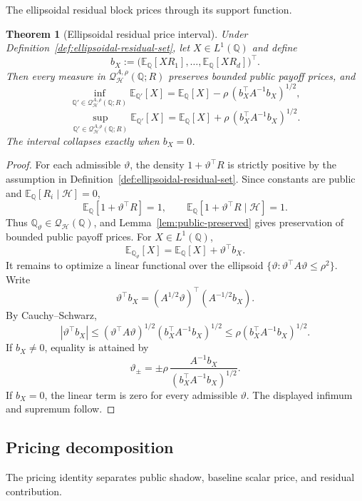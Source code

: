 \documentclass[11pt,a4paper]{amsart}
\theoremstyle{plain}
\newtheorem{theorem}{Theorem}[section]
\theoremstyle{definition}
\theoremstyle{remark}
\newcommand{\QQ}{\mathbb{Q}}
\newcommand{\EE}{\mathbb{E}}
\newcommand{\cH}{\mathcal{H}}
\newcommand{\cQ}{\mathcal{Q}}
\begin{document}
The ellipsoidal residual block prices through its support function.

\begin{theorem}[Ellipsoidal residual price interval]\label{thm:robust-residual-interval}
Under Definition~\ref{def:ellipsoidal-residual-set}, let \(X\in L^1(\QQ)\) and define
\[
        b_X
        :=
        \bigl(\EE_\QQ[XR_1],\ldots,\EE_\QQ[XR_d]\bigr)^\top.
\]
Then every measure in \(\cQ_{\cH}^{A,\rho}(\QQ;R)\) preserves bounded public payoff prices, and
\[
        \inf_{\QQ'\in\cQ_{\cH}^{A,\rho}(\QQ;R)}
        \EE_{\QQ'}[X]
        =
        \EE_\QQ[X]
        -
        \rho\,(b_X^\top A^{-1}b_X)^{1/2},
\]
\[
        \sup_{\QQ'\in\cQ_{\cH}^{A,\rho}(\QQ;R)}
        \EE_{\QQ'}[X]
        =
        \EE_\QQ[X]
        +
        \rho\,(b_X^\top A^{-1}b_X)^{1/2}.
\]
The interval collapses exactly when \(b_X=0\).
\end{theorem}

\begin{proof}
For each admissible \(\vartheta\), the density \(1+\vartheta^\top R\) is strictly positive by the
assumption in Definition~\ref{def:ellipsoidal-residual-set}.  Since constants are public and
\(\EE_\QQ[R_i\mid\cH]=0\),
\[
        \EE_\QQ[1+\vartheta^\top R]=1,
        \qquad
        \EE_\QQ[1+\vartheta^\top R\mid\cH]=1.
\]
Thus \(\QQ_\vartheta\in\cQ_{\cH}(\QQ)\), and Lemma~\ref{lem:public-preserved} gives preservation of
bounded public payoff prices.  For \(X\in L^1(\QQ)\),
\[
        \EE_{\QQ_\vartheta}[X]
        =
        \EE_\QQ[X]+\vartheta^\top b_X.
\]
It remains to optimize a linear functional over the ellipsoid
\(\{\vartheta:\vartheta^\top A\vartheta\le\rho^2\}\).  Write
\[
        \vartheta^\top b_X
        =
        (A^{1/2}\vartheta)^\top(A^{-1/2}b_X).
\]
By Cauchy--Schwarz,
\[
        |\vartheta^\top b_X|
        \le
        (\vartheta^\top A\vartheta)^{1/2}(b_X^\top A^{-1}b_X)^{1/2}
        \le
        \rho(b_X^\top A^{-1}b_X)^{1/2}.
\]
If \(b_X\ne0\), equality is attained by
\[
        \vartheta_\pm
        =
        \pm
        \rho\,
        \frac{A^{-1}b_X}{(b_X^\top A^{-1}b_X)^{1/2}}.
\]
If \(b_X=0\), the linear term is zero for every admissible \(\vartheta\).  The displayed infimum
and supremum follow.
\end{proof}

\subsection{Pricing decomposition}

The pricing identity separates public shadow, baseline scalar price, and residual contribution.
\end{document}

